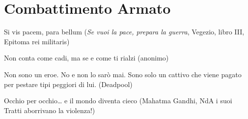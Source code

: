 \section{Combattimento Armato}\label{combattimento-armato}

\begin{enfasi}{
Si vis pacem, para bellum (\emph{Se vuoi la pace, prepara la guerra}, Vegezio, libro III, Epitoma rei militaris)
\smallskip

Non conta come cadi, ma se e come ti rialzi (anonimo)

\smallskip

Non sono un eroe. No e non lo sarò mai. Sono solo un cattivo che viene pagato per pestare tipi peggiori di lui. (Deadpool)

\smallskip

Occhio per occhio… e il mondo diventa cieco (Mahatma Gandhi, NdA i suoi Tratti aborrivano la violenza!)}\end{enfasi}

